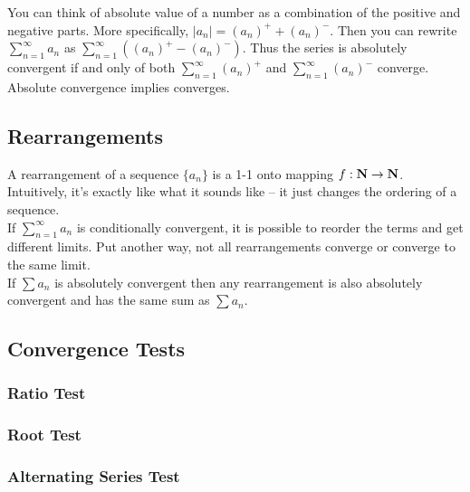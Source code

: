     You can think of absolute value of a number as a combination of the positive and negative 
    parts. More specifically, $|a_n| = (a_n)^+ + (a_n)^-$. Then you can rewrite 
    $\sum_{n=1}^{\infty} a_n$ as $\sum_{n=1}^{\infty} ((a_n)^+ - (a_n)^-)$. Thus the series
    is absolutely convergent if and only of both $\sum_{n=1}^{\infty} (a_n)^+$ and 
    $\sum_{n=1}^{\infty} (a_n)^-$ converge.\\

    \thm Absolute convergence implies converges.\\

    \pf {}

  \subsection{Rearrangements}
    A rearrangement of a sequence $\{a_n\}$ is a 1-1 onto mapping $f:\mathbf{N} \to \mathbf{N}$.
    Intuitively, it's exactly like what it sounds like -- it just changes the ordering of a 
    sequence.\\

    If $\sum_{n=1}^{\infty} a_n$ is conditionally convergent, it is possible to reorder the terms
    and get different limits. Put another way, not all rearrangements converge or converge to 
    the same limit.\\
    \thm If $\sum a_n$ is absolutely convergent then any rearrangement is also absolutely 
    convergent and has the same sum as $\sum a_n$.\\

    \pf {} 
  \subsection{Convergence Tests}
    \subsubsection{Ratio Test}
    \subsubsection{Root Test}
    \subsubsection{Alternating Series Test}
